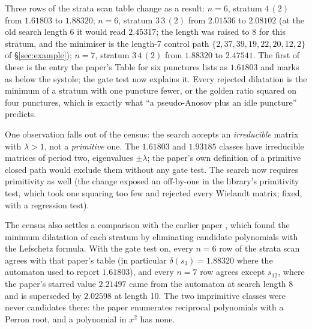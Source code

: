 \documentclass[12pt]{amsart}
\newcommand{\lam}{\lambda}
\theoremstyle{plain}
\theoremstyle{definition}
\begin{document}
Three rows of the strata scan table change as a result: $n=6$, stratum
$4\,(2)$ from $1.61803$ to $1.88320$; $n=6$, stratum $3\,3\,(2)$ from
$2.01536$ to $2.08102$ (at the old search length 6 it would read
$2.45317$; the length was raised to 8 for this stratum, and the minimiser
is the length-7 control path $\{2,37,39,19,22,20,12,2\}$ of
\S\ref{sec:example}); $n=7$, stratum $3\,4\,(2)$ from $1.88320$ to
$2.47541$.  The first of these is the entry the paper's Table for six
punctures lists as $1.61803$ and marks as below the systole; the gate test
now explains it.  Every rejected dilatation is the minimum of a stratum
with one puncture fewer, or the golden ratio squared on four punctures,
which is exactly what ``a pseudo-Anosov plus an idle puncture'' predicts.

One observation falls out of the census: the search accepts an
\emph{irreducible} matrix with $\lam>1$, not a \emph{primitive} one.
The $1.61803$ and $1.93185$ classes have irreducible matrices of period
two, eigenvalues $\pm\lam$; the paper's own definition of a primitive
closed path would exclude them without any gate test.  The search now
requires primitivity as well (the change exposed an off-by-one in the
library's primitivity test, which took one squaring too few and rejected
every Wielandt matrix; fixed, with a regression test).

The census also settles a comparison with the earlier paper
\cite{Lanneau2011b}, which found the minimum dilatation of each stratum by
eliminating candidate polynomials with the Lefschetz formula.  With the
gate test on, every $n=6$ row of the strata scan agrees with that paper's
table (in particular $\delta(s_3)=1.88320$ where the automaton used to
report $1.61803$), and every $n=7$ row agrees except $s_{12}$, where the
paper's starred value $2.21497$ came from the automaton at search length 8
and is superseded by $2.02598$ at length 10.  The two imprimitive classes
were never candidates there: the paper enumerates reciprocal polynomials
with a Perron root, and a polynomial in $x^2$ has none.
\end{document}
